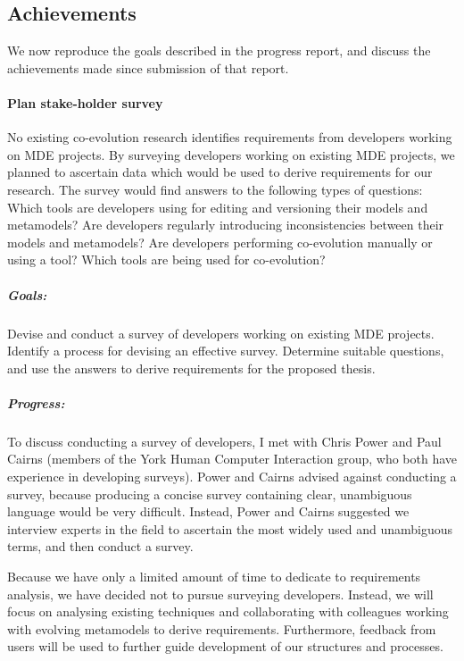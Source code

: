 
\subsection{Achievements}
We now reproduce the goals described in the progress report, and discuss the achievements made since submission of that report.

\paragraph{Plan stake-holder survey}
No existing co-evolution research identifies requirements from developers working on MDE projects. By surveying developers working on existing MDE projects, we planned to ascertain data which would be used to derive requirements for our research. The survey would find answers to the following types of questions: Which tools are developers using for editing and versioning their models and metamodels? Are developers regularly introducing inconsistencies between their models and metamodels? Are developers performing co-evolution manually or using a tool? Which tools are being used for co-evolution?

\subparagraph{Goals:} Devise and conduct a survey of developers working on existing MDE projects. Identify a process for devising an effective survey. Determine suitable questions, and use the answers to derive requirements for the proposed thesis.

\subparagraph{Progress:} To discuss conducting a survey of developers, I met with Chris Power and Paul Cairns (members of the York Human Computer Interaction group, who both have experience in developing surveys). Power and Cairns advised against conducting a survey, because producing a concise survey containing clear, unambiguous language would be very difficult. Instead, Power and Cairns suggested we interview experts in the field to ascertain the most widely used and unambiguous terms, and then conduct a survey.

Because we have only a limited amount of time to dedicate to requirements analysis, we have decided not to pursue surveying developers. Instead, we will focus on analysing existing techniques and collaborating with colleagues working with evolving metamodels to derive requirements. Furthermore, feedback from users will be used to further guide development of our structures and processes.


